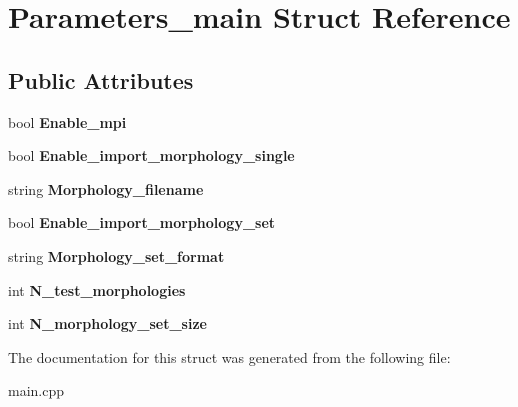 \hypertarget{struct_parameters__main}{}\section{Parameters\+\_\+main Struct Reference}
\label{struct_parameters__main}
\subsection*{Public Attributes}
\begin{DoxyCompactItemize}
\item 
\mbox{\label{struct_parameters__main_a619e840588f49eeba1c9d8757798c30e}} 
bool {\bfseries Enable\+\_\+mpi}
\item 
\mbox{\label{struct_parameters__main_a433c8fa80ee6c02fe5613d4eb2075546}} 
bool {\bfseries Enable\+\_\+import\+\_\+morphology\+\_\+single}
\item 
\mbox{\label{struct_parameters__main_afa70eb9e8a4c918f678a26fa202650b1}} 
string {\bfseries Morphology\+\_\+filename}
\item 
\mbox{\label{struct_parameters__main_a8aa74759fabf23d020278b8b98a2d155}} 
bool {\bfseries Enable\+\_\+import\+\_\+morphology\+\_\+set}
\item 
\mbox{\label{struct_parameters__main_afecfab3c5afbb2bc04ef3d5e8064c4a5}} 
string {\bfseries Morphology\+\_\+set\+\_\+format}
\item 
\mbox{\label{struct_parameters__main_a14e42c0e58188c19f860de2046cf796b}} 
int {\bfseries N\+\_\+test\+\_\+morphologies}
\item 
\mbox{\label{struct_parameters__main_a60ee2e45a155f2bef0681753e877bc5f}} 
int {\bfseries N\+\_\+morphology\+\_\+set\+\_\+size}
\end{DoxyCompactItemize}


The documentation for this struct was generated from the following file\+:\begin{DoxyCompactItemize}
\item 
main.\+cpp\end{DoxyCompactItemize}
